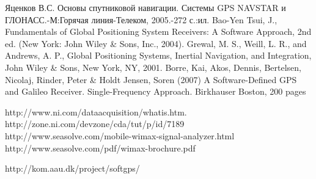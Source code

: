 \begin{thebibliography}{99}
 Яценков В.С. Основы спутниковой навигации. Системы GPS NAVSTAR и ГЛОНАСС.-М:Горячая линия-Телеком, 2005.-272 с.:ил.
 Bao-Yen Tsui, J., Fundamentals of Global Positioning System Receivers: A Software Approach, 2nd ed. (New York: John Wiley \& Sons, Inc., 2004).
 Grewal, M. S., Weill, L. R., and Andrews, A. P., Global Positioning Systems, Inertial Navigation, and Integration, John Wiley \& Sons, New York, NY, 2001.
 Borre, Kai, Akos, Dennis, Bertelsen, Nicolaj, Rinder, Peter \& Holdt Jensen, Soren (2007) A Software-Defined GPS and Galileo Receiver. Single-Frequency Approach. Birkhauser Boston, 200 pages

 http://www.ni.com/dataacquisition/whatis.htm.
 http://zone.ni.com/devzone/cda/tut/p/id/7189
 http://www.seasolve.com/mobile-wimax-signal-analyzer.html
 http://www.seasolve.com/pdf/wimax-brochure.pdf

 http://kom.aau.dk/project/softgps/

\end{thebibliography}
